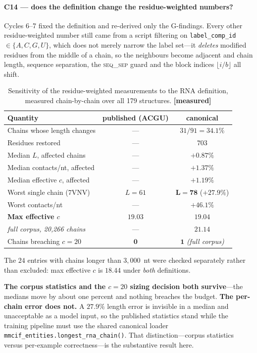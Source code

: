 \documentclass[11pt,a4paper]{article}
\newcommand{\meas}{\textcolor{measured}{\textbf{[measured]}}}
\begin{document}
\paragraph{C14 --- does the definition change the residue-weighted numbers?}
Cycles 6--7 fixed the definition and re-derived only the G-findings. Every other
residue-weighted number still came from a script filtering on
\texttt{label\_comp\_id} $\in \{A,C,G,U\}$, which does not merely narrow the
label set---it \emph{deletes} modified residues from the middle of a chain, so
the neighbours become adjacent and chain length, sequence separation, the
\textsc{seq\_sep} guard and the block indices $\lfloor i/b \rfloor$ all shift.

\begin{table}[h]
\centering
\caption{Sensitivity of the residue-weighted measurements to the RNA definition,
measured chain-by-chain over all 179 structures. \meas}
\small
\begin{tabular}{lcc}
\toprule
\textbf{Quantity} & \textbf{published (ACGU)} & \textbf{canonical} \\
\midrule
Chains whose length changes      & ---      & $31/91 = \mathbf{34.1\%}$ \\
Residues restored                & ---      & $703$ \\
Median $L$, affected chains      & ---      & $+0.87\%$ \\
Median contacts/nt, affected     & ---      & $+1.37\%$ \\
Median effective $c$, affected   & ---      & $+1.19\%$ \\
Worst single chain (7VNV)        & $L=61$   & $\mathbf{L=78}$ ($+27.9\%$) \\
Worst contacts/nt                & ---      & $+46.1\%$ \\
\textbf{Max effective $c$}       & $19.03$  & $\mathbf{19.04}$ \\
\quad\emph{full corpus, 20{,}266 chains} & --- & $\mathbf{21.14}$ \\
Chains breaching $c=20$          & $\mathbf{0}$ & $\mathbf{1}$ \emph{(full corpus)} \\
\bottomrule
\end{tabular}
\end{table}

The $24$ entries with chains longer than $3{,}000$~nt were checked separately
rather than excluded: max effective $c$ is $18.44$ under \emph{both} definitions.

\textbf{The corpus statistics and the $c=20$ sizing decision both survive}---the
medians move by about one percent and nothing breaches the budget. \textbf{The
per-chain error does not.} A $27.9\%$ length error is invisible in a median and
unacceptable as a model input, so the published statistics stand while the
training pipeline must use the shared canonical loader
\texttt{mmcif\_entities.longest\_rna\_chain()}. That distinction---corpus
statistics versus per-example correctness---is the substantive result here.
\end{document}
